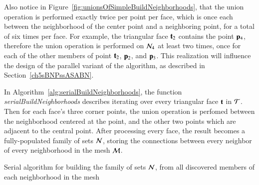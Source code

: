 Also notice in Figure~\ref{fig:unionsOfSimpleBuildNeighborhoods}, that the union operation is performed exactly twice per point per face, which is once each between the neighborhood of the center point and a neighboring point, for a total of six times per face. For example, the triangular face $\mathbf{t}_2$ contains the point $\mathbf{p}_4$, therefore the union operation is performed on $\mathcal{N}_4$ at least two times, once for each of the other members of point $\mathbf{t}_2$, $\mathbf{p}_2$, and $\mathbf{p}_3$. This realization will influence the design of the parallel variant of the algorithm, as described in Section~\ref{ch5sBNPssASABN}.

In Algorithm~\ref{alg:serialBuildNeighborhoods}, the function \textit{serialBuildNeighborhoods} describes iterating over every triangular face $\mathbf{t}$ in $\mathcal{T}$. Then for each face's three corner points, the union operation is perfomed between the neighborhood centered at the point, and the other two points which are adjacent to the central point. After processing every face, the result becomes a fully-populated family of sets $\mathcal{N}$, storing the connections between every neighbor of every neighborhood in the mesh $\mathcal{M}$.

\begin{algorithm}[ht]
	\DontPrintSemicolon


	\bigskip
\nl	{}

	\bigskip
\nl	{}
	\caption{Serial algorithm for building the family of sets $\mathcal{N}$, from all discovered members of each neighborhood in the mesh\label{alg:serialBuildNeighborhoods}}
\end{algorithm}%

